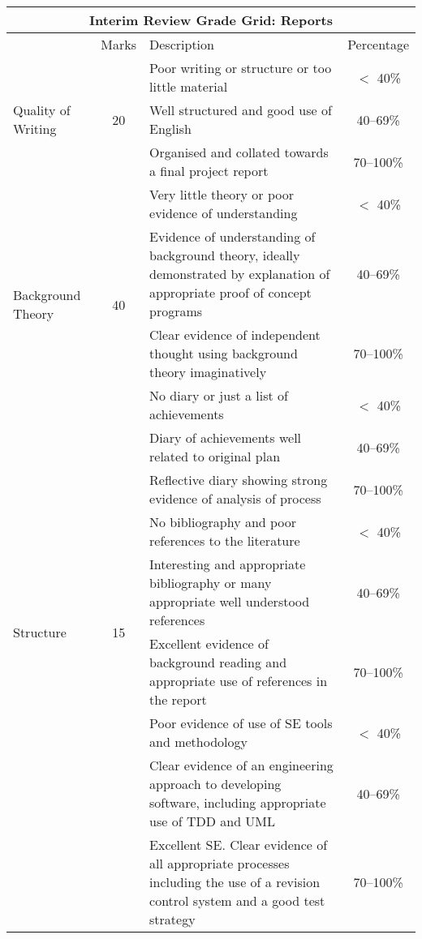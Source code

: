 \documentclass[11pt]{article}
\begin{document}
\noindent
\begin{tabular}{||l|c|p{10cm}|c||}
\hline
\hline
\multicolumn{4}{||c||}{Interim Review Grade Grid: Reports}\\
\hline
\hline
& Marks & Description & Percentage\\
\hline
\hline
\multirow{3}{*}{Quality of Writing} & \multirow{3}{*}{20} & Poor writing or structure or too little material& $<$ 40\% \\
\cline{3-4}
&& Well structured and good use of English & 40--69\% \\
\cline{3-4}
&& Organised and collated towards a final project report & 70--100\% \\
\hline
\hline
\multirow{4}{*}{Background Theory} & \multirow{4}{*}{40} & Very little theory or poor evidence of understanding & $<$ 40\% \\
\cline{3-4}
&&Evidence of understanding of background theory, ideally demonstrated by explanation of appropriate proof of concept programs & 40--69\% \\
\cline{3-4}
&&Clear evidence of independent thought using background theory imaginatively & 70--100\%  \\
\hline
\hline
\multirow{4}{*}{Project Diary}  & \multirow{4}{*}{10} & No diary or just a list of achievements & $<$ 40\% \\
\cline{3-4}
&& Diary of achievements well related to original plan & 40--69\% \\
\cline{3-4}
&& Reflective diary showing strong evidence of analysis of process & 70--100\% \\
\hline
\hline
\multirow{4}{*}{Structure} & \multirow{4}{*}{15} & No bibliography and poor references to the literature & $<$ 40\% \\
\cline{3-4}
&& Interesting and appropriate bibliography or many appropriate well understood references & 40--69\% \\
\cline{3-4}
&& Excellent evidence of background reading and appropriate use of references in the report & 70--100\% \\
\hline
\hline
\multirow{4}{*}{Software Engineering} & \multirow{4}{*}{15} & Poor evidence of use of SE tools and methodology & $<$ 40\% \\
\cline{3-4}
&& Clear evidence of an engineering approach to developing software, including appropriate use of TDD and UML & 40--69\% \\
\cline{3-4}
&& Excellent SE.  Clear evidence of all appropriate processes including the use of a revision control system and a good test strategy & 70--100\% \\

\end{tabular}
\end{document}
